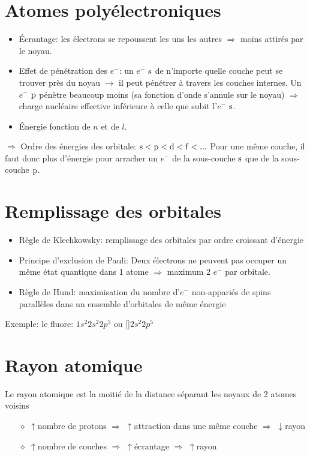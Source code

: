 \section{Atomes polyélectroniques}
\begin{itemize}
	\item \'Ecrantage: les électrons se repoussent les uns les autres $\Rightarrow$ moins attirés par le noyau.
	\item Effet de pénétration des $e^-$: un $e^-$ $\mathrm{s}$ de n'importe quelle couche peut se trouver près du noyau $\rightarrow$ il peut pénétrer à travers les couches internes.
		Un $e^-$ $\mathrm{p}$ pénètre beaucoup moins (sa fonction d'onde s'annule sur le noyau) $\Rightarrow$ charge nucléaire effective inférieure à celle que subit l'$e^-$ $\mathrm{s}$.
	\item \'Energie fonction de $n$ et de $l$.
\end{itemize}
$\Rightarrow$ Ordre des énergies des orbitale: $\mathrm{s}<\mathrm{p}<\mathrm{d}<\mathrm{f}<...$
Pour une même couche, il faut donc plus d'énergie pour arracher un $e^-$ de la sous-couche $\mathrm{s}$ que de la sous-couche $\mathrm{p}$.

\section{Remplissage des orbitales}
\begin{itemize}
	\item Règle de Klechkowsky: remplissage des orbitales par ordre croissant d'énergie
	\item Principe d'exclusion de Pauli: Deux électrons ne peuvent pas occuper un même état quantique dans 1 atome $\Rightarrow$ maximum 2 $e^-$ par orbitale.
	\item Règle de Hund: maximisation du nombre d'$e^-$ non-appariés de spins parallèles dans un ensemble d'orbitales de même énergie\\
\end{itemize}

Exemple: le fluore:  $1s^2 2s^2 2p^5$ ou []$2s^2 2p^5$


\section{Rayon atomique}
Le rayon atomique est la moitié de la distance séparant les noyaux de 2 atomes voisins
\begin{itemize}
	\item[$\diamond$]$\uparrow$nombre de protons $\Rightarrow$ $\uparrow$attraction dans une même couche $\Rightarrow$  $\downarrow$rayon
	\item[$\diamond$]$\uparrow$nombre de couches $\Rightarrow$ $\uparrow$écrantage $\Rightarrow$ $\uparrow$rayon
\end{itemize}

